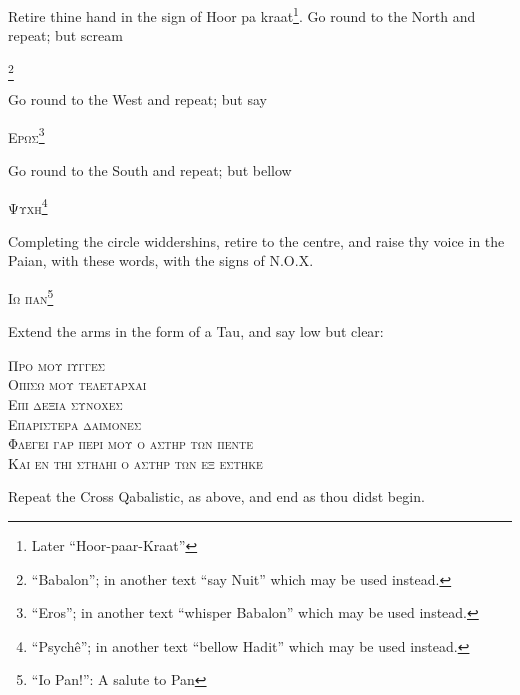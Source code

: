 Retire thine hand in the sign of Hoor pa kraat\footnote{Later \enquote{Hoor-paar-Kraat}}. Go round to the North and repeat; but scream \begin{quoting}[indentfirst=false]\textsc{\GreekBabalon}\footnote{\enquote{Babalon}; in another text \enquote{say Nuit} which may be used instead.} \end{quoting}

Go round to the West and repeat; but say \begin{quoting}[indentfirst=false]\textsc{Ερωσ}\footnote{\enquote{Eros}; in another text \enquote{whisper Babalon} which may be used instead.} \end{quoting}

Go round to the South and repeat; but bellow \begin{quoting}[indentfirst=false]\textsc{Ψυχη}\footnote{\enquote{Psych\^e}; in another text \enquote{bellow Hadit} which may be used instead.} \end{quoting}

Completing the circle widdershins, retire to the centre, and raise thy voice in the Paian, with these words, with the signs of N.O.X. \begin{quoting}[indentfirst=false]\textsc{Ιω παν}\footnote{\enquote{Io Pan!}: A salute to Pan}\end{quoting}

Extend the arms in the form of a Tau, and say low but clear:

\begin{quoting}[indentfirst=false]
\textsc{Προ μου ιυγγεσ} \\
\textsc{Οπισω μου τελεταρχαι} \\
\textsc{Επι δεξια συνοχεσ} \\
\textsc{Επαριστερα δαιμονεσ} \\
\textsc{Φλεγει γαρ περι μου ο αστηρ των πεντε} \\
\textsc{Και εν τηι στηληι ο αστηρ των εξ εστηκε}\footnotemark
\end{quoting}

Repeat the Cross Qabalistic, as above, and end as thou didst begin.
